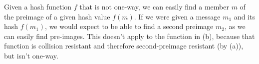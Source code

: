 Given a hash function $f$ that is not one-way, we can easily find a member $m$ of the preimage of a given hash value $f(m)$. If we were given a message $m_1$ and its hash $f(m_1)$, we would expect to be able to find a second preimage $m_2$, as we can easily find pre-images. This doesn't apply to the function in (b), because that function is collision resistant and therefore second-preimage resistant (by (a)), but isn't one-way.
